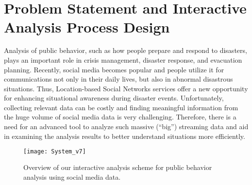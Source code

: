 \section{Problem Statement and Interactive Analysis Process Design}
\label{sec:analysis_process}
Analysis of public behavior, such as how people prepare and respond to disasters, plays an important role in crisis management, disaster response, and evacuation planning. 
Recently, social media becomes popular and people utilize it for communications not only in their daily lives, but also in abnormal disastrous situations.
Thus, Location-based Social Networks services offer a new opportunity for enhancing situational awareness during disaster events.
Unfortunately, collecting relevant data can be costly and finding meaningful information from the huge volume of social media data is very challenging.
Therefore, there is a need for an advanced tool to analyze such massive (\textquotedblleft big\textquotedblright) streaming data and aid in examining the analysis results to better understand situations more efficiently.

\begin{figure}[tb]
\texttt{[image: System\_v7]}
\caption{Overview of our interactive analysis scheme for public behavior analysis using social media data.}
\label{fig:analysis_process}
\end{figure}

